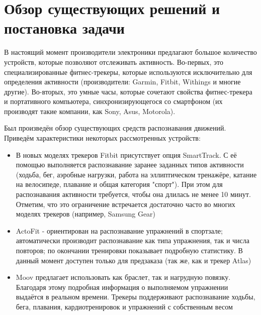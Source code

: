 \section{Обзор существующих решений и постановка задачи}

В настоящий момент производители электроники предлагают большое количество устройств, которые позволяют отслеживать активность. Во-первых, это специализированные фитнес-трекеры, которые используются исключительно для определения активности (производители: Garmin, Fitbit, Withings и многие другие). Во-вторых, это умные часы, которые сочетают свойства фитнес-трекера и портативного компьютера, синхронизирующегося со смартфоном (их производят такие компании, как Sony, Asus, Motorola). 

Был произведён обзор существующих средств распознавания движений. Приведём характеристики некоторых рассмотренных устройств: 

\begin{itemize}
\item В новых моделях трекеров Fitbit присутствует опция SmartTrack. С её помощью выполняется распознавание заранее заданных типов активности (ходьба, бег, аэробные нагрузки, работа на эллиптическом тренажёре, катание на велосипеде, плавание и общая категория "спорт"). При этом для распознавания активности требуется, чтобы она длилась не менее 10 минут. Отметим, что это ограничение встречается достаточно часто во многих моделях трекеров (например, Samsung Gear)
\item ActoFit - ориентирован на распознавание упражнений в спортзале; автоматически производит распознавание как типа упражнения, так и числа повторов; по окончании тренировки показывает подробную статистику. В данный момент доступен только для предзаказа (так же, как и трекер Atlas)
\item Moov предлагает использовать как браслет, так и нагрудную повязку. Благодаря этому подробная информация о выполняемом упражнении выдаётся в реальном времени. Трекеры поддерживают распознавание ходьбы, бега, плавания, кардиотренировок и упражнений с собственным весом
\end{itemize}

